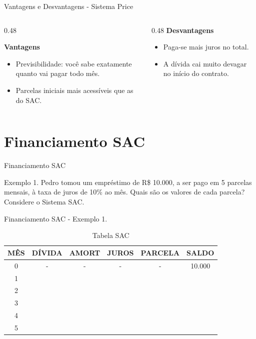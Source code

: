 \documentclass[12pt]{beamer}
\begin{document}
		\begin{frame}{Vantagens e Desvantagens - Sistema Price}
			
			\begin{columns}[T]
				
				\begin{column}{0.48\textwidth}
					
					\textbf{Vantagens}
					\begin{itemize}
						\item Previsibilidade: você sabe exatamente quanto vai pagar todo mês.
						\item Parcelas iniciais mais acessíveis que as do SAC.
					\end{itemize}
				\end{column}
				
				\begin{column}{0.48\textwidth}
					\textbf{Desvantagens}
					\begin{itemize}
						\item Paga-se mais juros no total.
						\item A dívida cai muito devagar no início do contrato.
					\end{itemize}
				\end{column}
				
			\end{columns}
			
		\end{frame}
		
	\section{Financiamento SAC}
	
	
	
		\begin{frame}{Financiamento SAC}
			\begin{exampleblock}{Exemplo 1.}
				\justifying
				Pedro tomou um empréstimo de R\$ 10.000, a ser pago em 5 parcelas mensais, à taxa de juros de 10\% ao mês. Quais são os valores de cada parcela? Considere o Sistema SAC.
			\end{exampleblock}
		\end{frame}

		
		\begin{frame}{Financiamento SAC - Exemplo 1.}
			\begin{table}[h]
				\centering
				\begin{tabular}{|c|c|c|c|c|c|}
					\hline
					MÊS & DÍVIDA & AMORT & JUROS & PARCELA & SALDO \\
					\hline
					0 & - & - & - & - & 10.000 \\
					\hline
					1 & & & & & \\
					\hline
					2 & & & & & \\
					\hline
					3 & & & & & \\
					\hline
					4 & & & & & \\
					\hline
					5 & & & & & \\
					\hline
				\end{tabular}
				\caption{Tabela SAC}
			\end{table}
		\end{frame}
		
\end{document}
